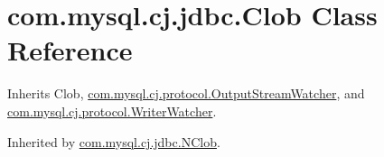 \hypertarget{classcom_1_1mysql_1_1cj_1_1jdbc_1_1_clob}{}\section{com.\+mysql.\+cj.\+jdbc.\+Clob Class Reference}
\label{classcom_1_1mysql_1_1cj_1_1jdbc_1_1_clob}


Inherits Clob, \mbox{\hyperlink{interfacecom_1_1mysql_1_1cj_1_1protocol_1_1_output_stream_watcher}{com.\+mysql.\+cj.\+protocol.\+Output\+Stream\+Watcher}}, and \mbox{\hyperlink{interfacecom_1_1mysql_1_1cj_1_1protocol_1_1_writer_watcher}{com.\+mysql.\+cj.\+protocol.\+Writer\+Watcher}}.



Inherited by \mbox{\hyperlink{classcom_1_1mysql_1_1cj_1_1jdbc_1_1_n_clob}{com.\+mysql.\+cj.\+jdbc.\+N\+Clob}}.

